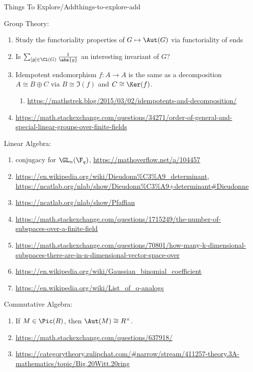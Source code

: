 \begin{remark}{Things To Explore/Add}{things-to-explore-add}
\begin{enumerate}
    \end{enumerate}
    Group Theory:
    \begin{enumerate}
        \item Study the functoriality properties of $G\mapsto\Aut(G)$ via functoriality of ends
        \item Is $\sum_{[g]\in\Cl(G)}\frac{1}{\abs{g}}$ an interesting invariant of $G$?
        \item Idempotent endomorphism $f\colon A\to A$ is the same as a decomposition $A\cong B\oplus C$ via $B\cong\Im(f)$ and $C\cong\Ker(f)$.
            \begin{enumerate}
                \item \url{https://mathstrek.blog/2015/03/02/idempotents-and-decomposition/}
            \end{enumerate}
        \item \url{https://math.stackexchange.com/questions/34271/order-of-general-and-special-linear-groups-over-finite-fields}
    \end{enumerate}
    Linear Algebra:
    \begin{enumerate}
        \item conjugacy for $\GL_{n}(\F_{q})$, \url{https://mathoverflow.net/a/104457}
        \item \url{https://en.wikipedia.org/wiki/Dieudonn\%C3\%A9_determinant}, \url{https://ncatlab.org/nlab/show/Dieudonn\%C3\%A9+determinant\#Dieudonne}
        \item \url{https://ncatlab.org/nlab/show/Pfaffian}
        \item \url{https://math.stackexchange.com/questions/1715249/the-number-of-subspaces-over-a-finite-field}
        \item \url{https://math.stackexchange.com/questions/70801/how-many-k-dimensional-subspaces-there-are-in-n-dimensional-vector-space-over}
        \item \url{https://en.wikipedia.org/wiki/Gaussian_binomial_coefficient}
        \item \url{https://en.wikipedia.org/wiki/List_of_q-analogs}
    \end{enumerate}
    Commutative Algebra:
    \begin{enumerate}
        \item If $M\in\Pic(R)$, then $\Aut(M)\cong R^{\times}$.
        \item \url{https://math.stackexchange.com/questions/637918/}
        \item \url{https://categorytheory.zulipchat.com/#narrow/stream/411257-theory.3A-mathematics/topic/Big.20Witt.20ring}

\end{enumerate}
\end{remark}
